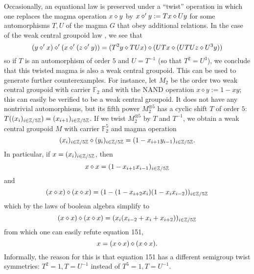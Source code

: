 Occasionally, an equational law is preserved under a ``twist'' operation in which one replaces the magma operation $x \diamond y$ by $x \diamond' y := Tx \diamond Uy$ for some automorphisms $T,U$ of the magma $G$ that obey additional relations.  In the case of the weak central groupoid law , we see that
$$
(y \diamond' x) \diamond' (x \diamond' (z \diamond' y))= (T^2 y \diamond TUx) \diamond (UTx \diamond (UTUz \diamond U^3y))$$
so if $T$ is an automorphism of order $5$ and $U = T^{-1}$ (so that $T^2 = U^3$), we conclude that this twisted magma is also a weak central groupoid.  This can be used to generate further counterexamples.  For instance, let $M_2$ be the order two weak central groupoid with carrier ${\mathbb F}_2$ and with the NAND operation $x \diamond y := 1 - xy$; this can easily be verified to be a weak central groupoid.  It does not have any nontrivial automorphisms, but its fifth power $M_2^{\otimes 5}$ has a cyclic shift $T$ of order $5$: $T( (x_i)_{i\in \mathbb{Z}/5\mathbb{Z}} ) = (x_{i+1})_{i \in \mathbb{Z}/5\mathbb{Z}}$.  If we twist $M_2^{\otimes 5}$ by $T$ and $T^{-1}$, we obtain a weak central groupoid $M$ with carrier ${\mathbb F}_2^5$ and magma operation
$$(x_i)_{i\in \mathbb{Z}/5\mathbb{Z}} \diamond (y_i)_{i\in \mathbb{Z}/5\mathbb{Z}} = (1 - x_{i+1} y_{i-1})_{i \in \mathbb{Z}/5\mathbb{Z}}.$$
In particular, if $x = (x_i)_{i\in \mathbb{Z}/5\mathbb{Z}}$, then
$$ x \diamond x = (1 - x_{i+1} x_{i-1})_{i \in \mathbb{Z}/5\mathbb{Z}}$$
and
$$ (x \diamond x) \diamond (x \diamond x) = (1 - (1 - x_{i+2} x_{i}) (1 - x_i x_{i-2}) )_{i \in \mathbb{Z}/5\mathbb{Z}}$$
which by the laws of boolean algebra simplify to
$$ (x \diamond x) \diamond (x \diamond x) = (x_i (x_{i-2} + x_i + x_{i+2}))_{i \in \mathbb{Z}/5\mathbb{Z}}$$
from which one can easily refute equation 151,
$$ x = (x \diamond x) \diamond (x \diamond x).$$
Informally, the reason for this is that equation 151 has a different semigroup twist symmetries: $T^2 = 1, T = U^{-1}$ instead of $T^5 = 1, T = U^{-1}$.

